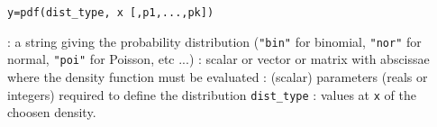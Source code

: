 \begin{mandesc}
\end{mandesc}
\begin{calling_sequence}
\begin{verbatim}
y=pdf(dist_type, x [,p1,...,pk])  
\end{verbatim}
\end{calling_sequence}
\begin{parameters}
  \begin{varlist}
   : a string giving the probability distribution (\verb!"bin"! for binomial, \verb!"nor"!
   for normal, \verb!"poi"! for Poisson, etc ...)
    : scalar or vector or matrix with abscissae where the density function must be evaluated
   : (scalar) parameters (reals or integers) required to define the distribution \verb!dist_type!
   : values at \verb+x+ of the choosen density.
  \end{varlist}
  \end{parameters}
  
